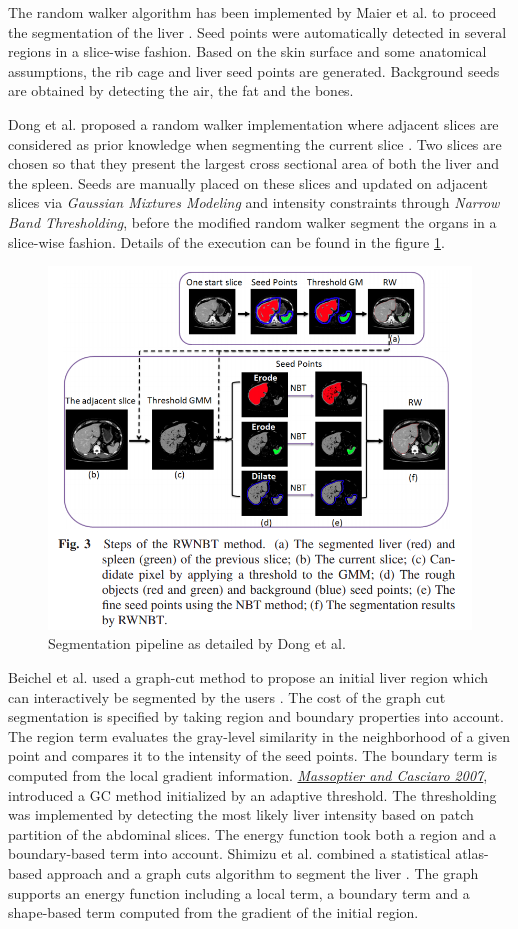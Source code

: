 \documentclass[]{article}
\begin{document}
The random walker algorithm has been implemented by Maier et al. to proceed the segmentation of the liver \cite{Maier2008}. Seed points were
automatically detected in several regions in a slice-wise fashion. Based
on the skin surface and some anatomical assumptions, the rib cage and
liver seed points are generated. Background seeds are obtained by
detecting the air, the fat and the bones.

Dong et al. proposed a random walker implementation where adjacent slices are
considered as prior knowledge when segmenting the current slice \cite{Dong2016}. Two
slices are chosen so that they present the largest cross sectional area
of both the liver and the spleen. Seeds are manually placed on these
slices and updated on adjacent slices via \emph{Gaussian Mixtures
	Modeling} and intensity constraints through \emph{Narrow Band
	Thresholding}, before the modified random walker segment the organs in a
slice-wise fashion. Details of the execution can be found in the figure
\ref{Dong2016_Fig3}.

\begin{figure}[th!]
	\centering
	\includegraphics[width=0.7\linewidth]{images/image14}
	\caption{Segmentation pipeline as detailed by Dong et al. \cite{Dong2016}}
	\label{Dong2016_Fig3}
\end{figure}


Beichel et al. used a graph-cut method to propose an initial liver
region which can interactively be segmented by the users \cite{Beichel2007}. The cost of
the graph cut segmentation is specified by taking region and boundary
properties into account. The region term evaluates the gray-level
similarity in the neighborhood of a given point and compares it to the
intensity of the seed points. The boundary term is computed from the
local gradient information.
\href{https://www.researchgate.net/publication/5844188_Fully_Automatic_Liver_Segmentation_through_Graph-Cut_Technique}{\emph{Massoptier
		and Casciaro 2007}}, introduced a GC method initialized by an adaptive
threshold. The thresholding was implemented by detecting the most likely
liver intensity based on patch partition of the abdominal slices. The
energy function took both a region and a boundary-based term into
account.
Shimizu et al. combined a statistical atlas-based approach and a graph
cuts algorithm to segment the liver \cite{Shimizu2011}. The graph supports an energy
function including a local term, a boundary term and a shape-based term
computed from the gradient of the initial region.
\end{document}
